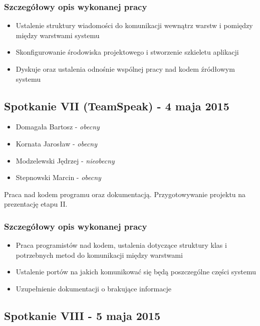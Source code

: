 \subsubsection*[Szczegółowy opis wykonanej pracy]{Szczegółowy opis wykonanej pracy}
\begin{itemize}
\item Ustalenie struktury wiadomości do komunikacji wewnątrz warstw i pomiędzy między warstwami systemu
\item Skonfigurowanie środowiska projektowego i stworzenie szkieletu aplikacji
\item Dyskuje oraz ustalenia odnośnie wspólnej pracy nad kodem źródłowym systemu
\end{itemize}

\subsection[Spotkanie VII (TeamSpeak) - 4 maja 2015]{Spotkanie VII (TeamSpeak) - 4 maja 2015}

\begin{itemize}
\item Domagała Bartosz - \textit{obecny}
\item Kornata Jarosław - \textit{obecny}
\item Modzelewski Jędrzej - \textit{nieobecny}
\item Stepnowski Marcin - \textit{obecny}
\end{itemize}

\par{Praca nad kodem programu oraz dokumentacją. Przygotowywanie projektu na prezentację etapu II.}

\subsubsection*[Szczegółowy opis wykonanej pracy]{Szczegółowy opis wykonanej pracy}
\begin{itemize}
\item Praca programistów nad kodem, ustalenia dotyczące struktury klas i potrzebnych metod do komunikacji między warstwami
\item Ustalenie portów na jakich komunikować się będą poszczególne części systemu
\item Uzupełnienie dokumentacji o brakujące informacje
\end{itemize}


\subsection[Spotkanie VIII - 5 maja 2015]{Spotkanie VIII - 5 maja 2015}

